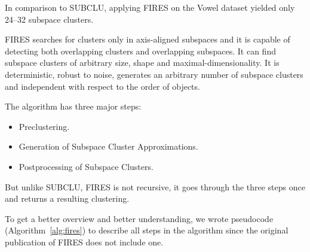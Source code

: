 In comparison to SUBCLU, applying FIRES on the Vowel dataset \citep{10.14778/1687627.1687770} yielded only 24--32 subspace clusters.

FIRES searches for clusters only in axis-aligned subspaces and it is capable of detecting both overlapping clusters and overlapping subspaces. It can find subspace clusters of arbitrary size, shape and maximal-dimensionality. It is deterministic, robust to noise, generates an arbitrary number of subspace clusters and independent with respect to the order of objects.

The algorithm has three major steps:
\begin{itemize}
	\item Preclustering.
	\item Generation of Subspace Cluster Approximations.
	\item Postprocessing of Subspace Clusters.
\end{itemize}
But unlike SUBCLU, FIRES is not recursive, it goes through the three steps once and returns a resulting clustering.

To get a better overview and better understanding, we wrote pseudocode (Algorithm~\ref{alg:fires}) to describe all steps in the algorithm since the original publication of FIRES does not include one.

